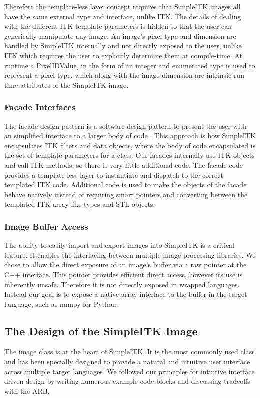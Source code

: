 \documentclass{frontiersMED} %
\begin{document}
Therefore the template-less layer concept requires that SimpleITK
images all have the same external type and interface, unlike ITK. The
details of dealing with the different ITK template parameters is
hidden so that the user can generically manipulate any image. An
image's pixel type and dimension are handled by SimpleITK internally
and not directly exposed to the user, unlike ITK which requires the
user to explicitly determine them at compile-time. At runtime a
PixelIDValue, in the form of an integer and enumerated type is used to
represent a pixel type, which along with the image dimension are
intrinsic run-time attributes of the SimpleITK image.

\subsubsection{Facade Interfaces}
The facade design pattern is a software design pattern to present the
user with an simplified interface to a larger body of code
\cite{Gamma1995}. This approach is how SimpleITK encapsulates ITK filters
and data objects, where  the body of code encapsulated is the set of
template parameters for a class. Our facades internally use ITK
objects and call ITK methods, so there is very little additional
code. The facade code provides a template-less layer to instantiate
and dispatch to the correct templated ITK code. Additional code is
used to make the objects of the facade behave natively instead of
requiring smart pointers and converting between the templated ITK
array-like types and STL objects.

\subsubsection{Image Buffer Access}
The ability to easily import and export images into SimpleITK is a
critical feature. It enables the interfacing between multiple image
processing libraries. We chose to allow the direct exposure of an
image's buffer via a raw pointer at the C++ interface. This pointer provides
efficient direct access, however its use is inherently unsafe.
Therefore it is not directly exposed in wrapped
languages. Instead our goal is to expose a native array interface to
the buffer in the target language, such as numpy for Python.

\subsection{The Design of the SimpleITK Image}
The image class is at the heart of SimpleITK. It is the most commonly
used class and has been specially designed to provide a natural and
intuitive user interface across multiple target languages. We followed
our principles for intuitive interface driven design by writing
numerous example code blocks and discussing tradeoffs with the ARB.
\end{document}
